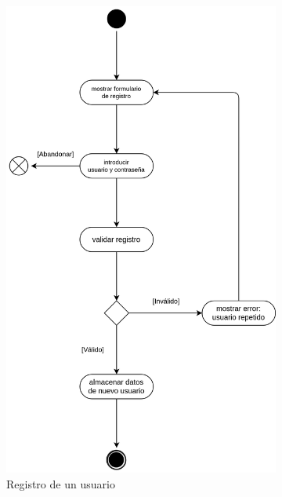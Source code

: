             \begin{figure}[h]
                \centering
                \begin{subfigure}{0.45\textwidth}
                    \centering
                    \includegraphics[scale=0.15]{images/Diagramas/Actividades y transiciones 1.png}
                    \caption{Registro de un usuario}
                    \label{fig:registro-usuario}
                \end{subfigure}
                \hfill
                \begin{subfigure}{0.45\textwidth}

\end{subfigure}
\end{figure}
